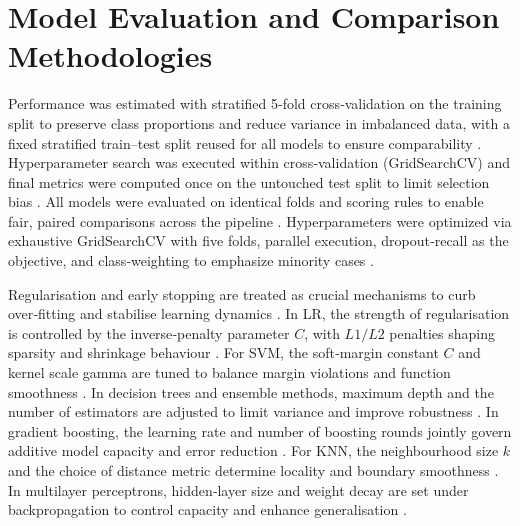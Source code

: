 \documentclass[ %
                    author={Carlos Duran Calle},
                supervisor={Dr. Felipe Campelo},
                    degree={MSc},
                     title={Comparative Machine Learning Analysis for Student Dropout Prediction in a Virtual Learning Environment},
                  subtitle={Incorporating Student Engagement and Socio-Economic Features},
                      type={},
                      year={2025}]{dissertation}
\begin{document}
\section{Model Evaluation and Comparison Methodologies}
Performance was estimated with stratified 5‑fold cross‑validation \cite{kohavi_study_1995} on the training split to preserve class proportions and reduce variance in imbalanced data, with a fixed stratified train–test split reused for all models to ensure comparability \cite{luque_impact_2019}. Hyperparameter search was executed within cross‑validation (GridSearchCV) and final metrics were computed once on the untouched test split to limit selection bias \cite{varma_bias_2006}. All models were evaluated on identical folds and scoring rules to enable fair, paired comparisons across the pipeline \cite{demsar_statistical_2006}. Hyperparameters were optimized via exhaustive GridSearchCV with five folds, parallel execution, dropout‑recall as the objective, and class‑weighting to emphasize minority cases \cite{kohavi_study_1995} \cite{krawczyk_learning_2016}.

Regularisation and early stopping are treated as crucial mechanisms to curb over‑fitting and stabilise learning dynamics \cite{prechelt_early_2012}. In LR, the strength of regularisation is controlled by the inverse‑penalty parameter $C$, with $L1/L2$ penalties shaping sparsity and shrinkage behaviour \cite{ng_feature_2004}. For SVM, the soft‑margin constant $C$ and kernel scale gamma are tuned to balance margin violations and function smoothness \cite{cortes_svm_1995}. In decision trees and ensemble methods, maximum depth and the number of estimators are adjusted to limit variance and improve robustness \cite{breiman_rf_2001}. In gradient boosting, the learning rate and number of boosting rounds jointly govern additive model capacity and error reduction \cite{friedman_gbm_2001}. For KNN, the neighbourhood size $k$ and the choice of distance metric determine locality and boundary smoothness \cite{cover_nearest_1967}. In multilayer perceptrons, hidden‑layer size and weight decay are set under backpropagation to control capacity and enhance generalisation \cite{krogh_simple_1991}. 






\end{document}
